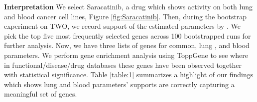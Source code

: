{\bf Interpretation}
We select Saracatinib, a drug which shows activity on both lung and blood cancer cell lines, Figure \ref{fig:Saracatinib}. 
Then, during the bootstrap experiment on TWO, we record support of the estimated parameters by \dc. 
We pick the top five most frequently selected genes across 100 bootstrapped runs for further analysis. 
Now, we have three lists of genes for common, lung , and blood parameters. 
We perform gene enrichment analysis using ToppGene \cite{chen09toppgene} to see where in functional/disease/drug databases these genes have been observed together with statistical significance. 
Table \ref{table:1} summarizes a highlight of our findings which shows lung and blood parameters' supports are correctly capturing a meaningful set of genes.%

